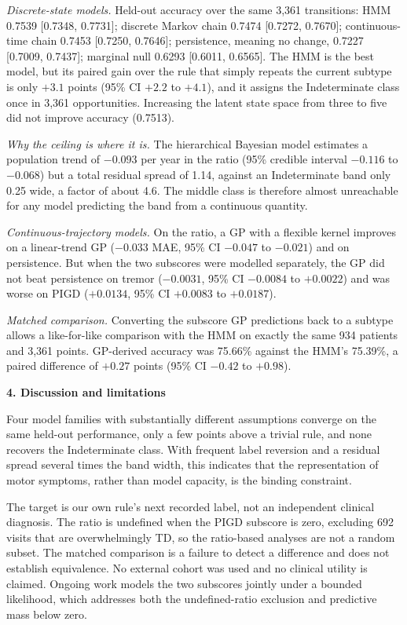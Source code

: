 \documentclass[10pt,a4paper]{article}
\newcommand{\sect}[1]{\vspace{0.25em}\noindent\textbf{#1}\par\nobreak\vspace{-0.15em}}
\begin{document}
\emph{Discrete-state models.} Held-out accuracy over the same 3,361 transitions: HMM
0.7539 [0.7348, 0.7731]; discrete Markov chain 0.7474 [0.7272, 0.7670]; continuous-time
chain 0.7453 [0.7250, 0.7646]; persistence, meaning no change, 0.7227 [0.7009, 0.7437];
marginal null 0.6293 [0.6011, 0.6565]. The HMM is the best model, but its paired gain
over the rule that simply repeats the current subtype is only $+3.1$ points (95\% CI
$+2.2$ to $+4.1$), and it assigns the Indeterminate class once in 3,361 opportunities.
Increasing the latent state space from three to five did not improve accuracy (0.7513).

\emph{Why the ceiling is where it is.} The hierarchical Bayesian model estimates a
population trend of $-0.093$ per year in the ratio (95\% credible interval $-0.116$ to
$-0.068$) but a total residual spread of 1.14, against an Indeterminate band only 0.25
wide, a factor of about 4.6. The middle class is therefore almost unreachable for any
model predicting the band from a continuous quantity.

\emph{Continuous-trajectory models.} On the ratio, a GP with a flexible kernel improves
on a linear-trend GP ($-0.033$ MAE, 95\% CI $-0.047$ to $-0.021$) and on persistence.
But when the two subscores were modelled separately, the GP did not beat persistence on
tremor ($-0.0031$, 95\% CI $-0.0084$ to $+0.0022$) and was worse on PIGD ($+0.0134$,
95\% CI $+0.0083$ to $+0.0187$).

\emph{Matched comparison.} Converting the subscore GP predictions back to a subtype
allows a like-for-like comparison with the HMM on exactly the same 934 patients and
3,361 points. GP-derived accuracy was 75.66\% against the HMM's 75.39\%, a paired
difference of $+0.27$ points (95\% CI $-0.42$ to $+0.98$).

\sect{4. Discussion and limitations}
Four model families with substantially different assumptions converge on the same
held-out performance, only a few points above a trivial rule, and none recovers the
Indeterminate class. With frequent label reversion and a residual spread several times
the band width, this indicates that the representation of motor symptoms, rather than
model capacity, is the binding constraint.

The target is our own rule's next recorded label, not an independent clinical
diagnosis. The ratio is undefined when the PIGD subscore is zero, excluding 692 visits
that are overwhelmingly TD, so the ratio-based analyses are not a random subset. The
matched comparison is a failure to detect a difference and does not establish
equivalence. No external cohort was used and no clinical utility is claimed. Ongoing
work models the two subscores jointly under a bounded likelihood, which addresses both
the undefined-ratio exclusion and predictive mass below zero.
\end{document}
